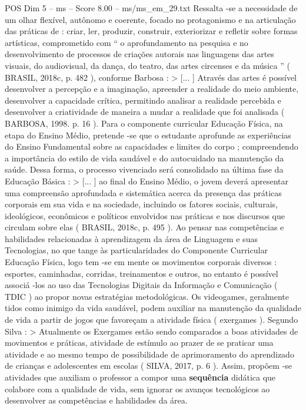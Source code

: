 \begin{textsample}{POS Dim 5 – ms – Score 8.00 – ms/ms\_em\_29.txt}
Ressalta -se a necessidade de um olhar flexível, autônomo e coerente, focado no protagonismo e na articulação das práticas de : criar, ler, produzir, construir, exteriorizar e refletir sobre formas artísticas, comprometido com “ o aprofundamento na pesquisa e no desenvolvimento de processos de criações autorais nas linguagens das artes visuais, do audiovisual, da dança, do teatro, das artes circenses e da música ” ( BRASIL, 2018c, p. 482 ), conforme Barbosa : > [... ] Através das artes é possível desenvolver a percepção e a imaginação, apreender a realidade do meio ambiente, desenvolver a capacidade crítica, permitindo analisar a realidade percebida e desenvolver a criatividade de maneira a mudar a realidade que foi analisada ( BARBOSA, 1998. p. 16 ).
Para o componente curricular Educação Física, na etapa do Ensino Médio, pretende -se que o estudante aprofunde as experiências do Ensino Fundamental sobre as capacidades e limites do corpo ; compreendendo a importância do estilo de vida saudável e do autocuidado na manutenção da saúde.
Dessa forma, o processo vivenciado será consolidado na última fase da Educação Básica : > [... ] ao final do Ensino Médio, o jovem deverá apresentar uma compreensão aprofundada e sistemática acerca da presença das práticas corporais em sua vida e na sociedade, incluindo os fatores sociais, culturais, ideológicos, econômicos e políticos envolvidos nas práticas e nos discursos que circulam sobre elas ( BRASIL, 2018c, p. 495 ).
Ao pensar nas competências e habilidades relacionadas à aprendizagem da área de Linguagem e suas Tecnologias, no que tange às particularidades do Componente Curricular Educação Física, logo tem -se em mente os movimentos corporais diversos : esportes, caminhadas, corridas, treinamentos e outros, no entanto é possível associá -los ao uso das Tecnologias Digitais da Informação e Comunicação ( TDIC ) ao propor novas estratégias metodológicas.
Os videogames, geralmente tidos como inimigo da vida saudável, podem auxiliar na manutenção da qualidade de vida a partir de jogos que favoreçam a atividade física ( exergames ).
Segundo Silva : > Atualmente os Exergames estão sendo comparados a boas atividades de movimentos e práticas, atividade de estímulo ao prazer de se praticar uma atividade e ao mesmo tempo de possibilidade de aprimoramento do aprendizado de crianças e adolescentes em escolas ( SILVA, 2017, p. 6 ).
Assim, propõem -se atividades que auxiliam o professor a compor uma \textbf{sequência} didática que colabore com a qualidade de vida, sem ignorar os avanços tecnológicos ao desenvolver as competências e habilidades da área.

\end{textsample}
